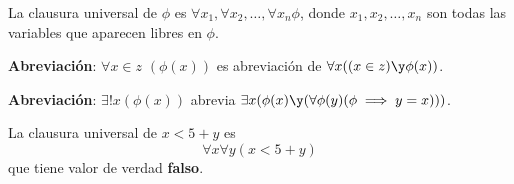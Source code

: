 \begin{defn}
	La clausura universal de $\phi$ es $\forall x_1, \forall x_2,\hdots, \forall x_n \phi$, donde $x_1, x_2, \hdots, x_n$ son todas las variables que aparecen libres en $\phi$.
	
	\textbf{Abreviación}: $\forall x\in z$ $(\phi(x))$ es abreviación de $\forall x ((x\in z) \y \phi (x))$.
	
	\textbf{Abreviación}: $\exists ! x(\phi (x))$ abrevia $\exists x(\phi (x) \y (\forall \phi(y) (\phi \implies y = x)))$.
\end{defn}

\begin{example}
	La clausura universal de $x < 5 + y$ es $$\forall x\forall y (x < 5 + y)$$ que tiene valor de verdad \textbf{falso}.
\end{example}

